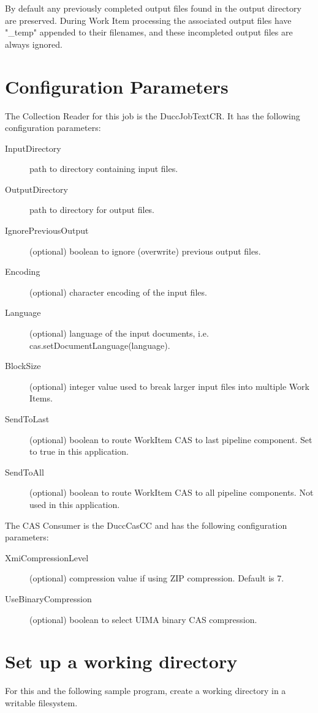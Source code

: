 By default any previously completed output files found in the output directory are preserved.
During Work Item processing the associated output files have "\_temp" appended to their
filenames, and these incompleted output files are always ignored.

\section{Configuration Parameters}
The Collection Reader for this job is the DuccJobTextCR. It has the following configuration
parameters:

\begin{description}
    \item[InputDirectory] path to directory containing input files.
    \item[OutputDirectory] path to directory for output files.
    \item[IgnorePreviousOutput] (optional) boolean to ignore (overwrite) previous output files.
    \item[Encoding] (optional) character encoding of the input files.
    \item[Language] (optional) language of the input documents, i.e. cas.setDocumentLanguage(language).
    \item[BlockSize] (optional) integer value used to break larger input files into multiple Work Items.
    \item[SendToLast] (optional) boolean to route WorkItem CAS to last pipeline component. Set to true in this application.
    \item[SendToAll] (optional) boolean to route WorkItem CAS to all pipeline components. Not used in this application.
\end{description}

The CAS Consumer is the DuccCasCC and has the following configuration parameters:

\begin{description}
  \item[XmiCompressionLevel] (optional) compression value if using ZIP compression. Default is 7.
  \item[UseBinaryCompression] (optional) boolean to select UIMA binary CAS compression.
\end{description}

\section{Set up a working directory}
For this and the following sample program, create a working directory in a writable filesystem.

